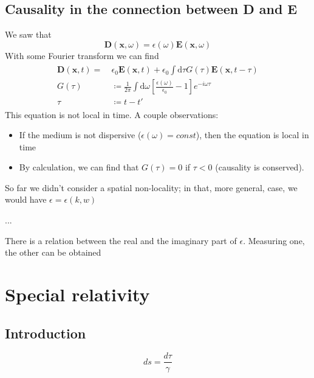 \documentclass[a4paper, twocolumn]{article}
\newcommand\id{\textrm{d}}
\begin{document}
\subsection{Causality in the connection between D and E}
\label{sec:caus-conn-betw}

We saw that
\begin{equation}
  \label{eq:66}
  \mathbf{D}(\mathbf{x},\omega)=\epsilon(\omega)\mathbf{E}(\mathbf{x},\omega)
\end{equation}
With some Fourier transform we can find
\begin{align}
  \label{eq:67}
  \begin{split}
    \mathbf{D}(\mathbf{x},t)=&~\epsilon_0\mathbf{E}(\mathbf{x},t)+\epsilon_0\int\mathrm{d}\tau G(\tau)\mathbf{E}(\mathbf{x},t-\tau) \\
    G(\tau)&~\coloneqq \frac{1}{2\pi}\int\id \omega\left[\frac{\epsilon(\omega)}{\epsilon_0}-1\right]e^{-i\omega\tau} \\
    \tau&~\coloneqq t-t'
  \end{split}
\end{align}
This equation is not local in time. A couple observations:
\begin{itemize}
\item If the medium is not dispersive ($\epsilon(\omega)=const$), then the equation is local in time
\item By calculation, we can find that $G(\tau)=0$ if $\tau<0$ (causality is conserved).
\end{itemize}
So far we didn't consider a spatial non-locality; in that, more general, case, we would have $\epsilon=\epsilon(k,w)$

...

There is a relation between the real and the imaginary part of $\epsilon$. Measuring one, the other can be obtained


\section{Special relativity}

\subsection{Introduction}
\begin{equation}
  ds= \frac{d\tau}{\gamma}
\end{equation}
\end{document}
